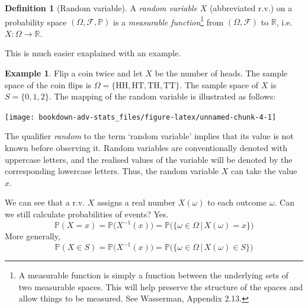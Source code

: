 \documentclass[
]{book}
\newcommand{\bbR}{\mathbb{R}}
\newcommand{\bbP}{\mathbb{P}}
\newcommand{\cF}{{\mathcal F}}
\theoremstyle{definition}
\newtheorem{definition}{Definition}[chapter]
\theoremstyle{definition}
\newtheorem{example}{Example}[chapter]
\theoremstyle{definition}
\theoremstyle{definition}
\theoremstyle{remark}
\begin{document}
\begin{definition}[Random variable]
A \emph{random variable} \(X\) (abbreviated r.v.) on a probability space \((\Omega,\cF,\bbP)\) is a \emph{measurable function}\footnote{A measurable function is simply a function between the underlying sets of two measurable spaces. This will help preserve the structure of the spaces and allow things to be measured. See Wasserman, Appendix 2.13.} from \((\Omega,\cF)\) to \(\bbR\), i.e.~\(X:\Omega\to\bbR\).
\end{definition}

This is much easier exaplained with an example.

\begin{example}

Flip a coin twice and let \(X\) be the number of heads.
The sample space of the coin flips is \(\Omega = \{\text{HH}, \text{HT}, \text{TH}, \text{TT} \}\).
The sample space of \(X\) is \(S = \{0,1,2 \}\).
The mapping of the random variable is illustrated as follows:

\begin{center}\texttt{[image: bookdown-adv-stats\_files/figure-latex/unnamed-chunk-4-1]} \end{center}

\end{example}

The qualifier \emph{random} to the term `random variable' implies that its value is not known before observing it.
Random variables are conventionally denoted with uppercase letters, and the realised values of the variable will be denoted by the corresponding lowercase letters. Thus, the random variable \(X\) can take the value \(x\).

We can see that a r.v. \(X\) assigns a real number \(X(\omega)\) to each outcome \(\omega\).
Can we still calculate probabilities of events? Yes.
\[
  \bbP(X=x) = \bbP\big(X^{-1}(x)\big) = \bbP\big(\{ \omega \in \Omega \,|\, X(\omega) = x\} \big)
\]
More generally,
\[
  \bbP(X\in S) = \bbP\big(X^{-1}(x)\big) = \bbP\big(\{ \omega \in \Omega \,|\, X(\omega) \in S \} \big)
\]
\end{document}
